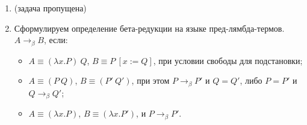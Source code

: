 \documentclass[10pt,a4paper,oneside]{article}
\begin{document}
\begin{enumerate}
\item (задача пропущена)

\item Сформулируем определение бета-редукции на языке пред-лямбда-термов. $A \rightarrow_\beta B$, если:
\begin{itemize}
\item $A \equiv (\lambda x.P)\ Q$, $B \equiv P\ [x := Q]$, при условии свободы для подстановки;
\item $A \equiv (P\ Q)$, $B \equiv (P'\ Q')$, при этом $P \rightarrow_\beta P'$ и $Q = Q'$, либо $P = P'$ и $Q \rightarrow_\beta Q'$;
\item $A \equiv (\lambda x.P)$, $B \equiv (\lambda x.P')$, и $P \rightarrow_\beta P'$.
\end{itemize}


\end{enumerate}
\end{document}
